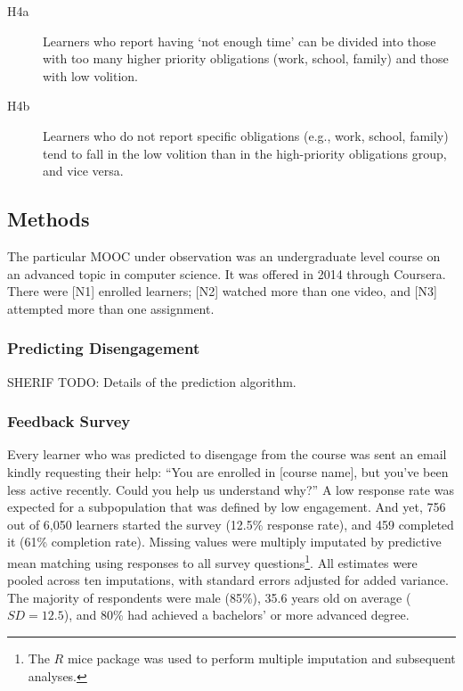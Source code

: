 \documentclass{sigchi}\usepackage[]{graphicx}\usepackage[]{color}
\begin{document}
\begin{description}
  \item[H4a] Learners who report having `not enough time' can be divided into those with too many higher priority obligations (work, school, family) and those with low volition.
  \item[H4b] Learners who do not report specific obligations (e.g., work, school, family) tend to fall in the low volition than in the high-priority obligations group, and vice versa.
\end{description}  


\subsection{Methods}

The particular MOOC under observation was an undergraduate level course on an advanced topic in computer science. It was offered in 2014 through Coursera. There were [N1] enrolled learners; [N2] watched more than one video, and [N3] attempted more than one assignment.

\subsubsection{Predicting Disengagement}

SHERIF TODO: Details of the prediction algorithm.

\subsubsection{Feedback Survey}

Every learner who was predicted to disengage from the course was sent an email kindly requesting their help: ``You are enrolled in [course name], but you've been less active recently. Could you help us understand why?'' A low response rate was expected for a subpopulation that was defined by low engagement. And yet, 756 out of 6,050 learners started the survey (12.5\% response rate), and 459 completed it (61\% completion rate). Missing values were multiply imputated by predictive mean matching using responses to all survey questions\footnote{The $R$ mice package was used to perform multiple imputation and subsequent analyses.}. All estimates were pooled across ten imputations, with standard errors adjusted for added variance. The majority of respondents were male (85\%), 35.6 years old on average ($SD=12.5$), and 80\% had achieved a bachelors' or more advanced degree.
\end{document}
